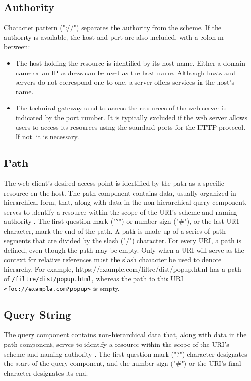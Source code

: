 \subsection*{Authority}
Character pattern ("://") separates the authority from the scheme. If the authority is available, the host and port are also included, with a colon in between:

\begin{itemize}
  \item The host holding the resource is identified by its host name. Either a domain name or an IP address can be used as the host name. Although hosts and servers do not correspond one to one, a server offers services in the host's name.
  \item The technical gateway used to access the resources of the web server is indicated by the port number. It is typically excluded if the web server allows users to access its resources using the standard ports for the HTTP protocol. If not, it is necessary.
\end{itemize}

\subsection*{Path}
The web client's desired access point is identified by the path as a specific resource on the host. The path component contains data, usually organized in hierarchical form, that, along with data in the non-hierarchical query component, serves to identify a resource within the scope of the URI's scheme and naming authority \autocite{berners2005uniform}. The first question mark ("?") or number sign ("\#"), or the last URI character, mark the end of the path. A path is made up of a series of path segments that are divided by the slash ("/") character. For every URI, a path is defined, even though the path may be empty. Only when a URI will serve as the context for relative references must the slash character be used to denote hierarchy. For example, \url{https://example.com/filtre/dist/popup.html} has a path of \texttt{/filtre/dist/popup.html}, whereas the path to this URI \texttt{<foo://example.com?popup>} is empty.

\subsection*{Query String}
The query component contains non-hierarchical data that, along with data in the path component, serves to identify a resource within the scope of the URI's scheme and naming authority \autocite{berners2005uniform}. The first question mark ("?") character designates the start of the query component, and the number sign ("\#") or the URI's final character designates its end.

